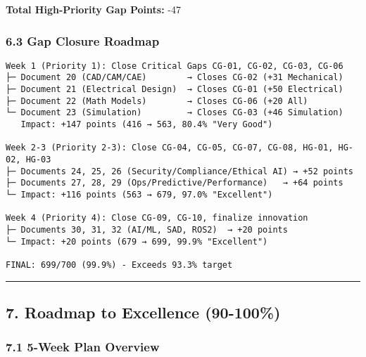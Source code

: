 \documentclass[
]{article}
\begin{document}
\textbf{Total High-Priority Gap Points:} -47

\hypertarget{gap-closure-roadmap}{%
\subsubsection{6.3 Gap Closure Roadmap}\label{gap-closure-roadmap}}

\begin{verbatim}
Week 1 (Priority 1): Close Critical Gaps CG-01, CG-02, CG-03, CG-06
├─ Document 20 (CAD/CAM/CAE)        → Closes CG-02 (+31 Mechanical)
├─ Document 21 (Electrical Design)  → Closes CG-01 (+50 Electrical)
├─ Document 22 (Math Models)        → Closes CG-06 (+20 All)
└─ Document 23 (Simulation)         → Closes CG-03 (+46 Simulation)
   Impact: +147 points (416 → 563, 80.4% "Very Good")

Week 2-3 (Priority 2-3): Close CG-04, CG-05, CG-07, CG-08, HG-01, HG-02, HG-03
├─ Documents 24, 25, 26 (Security/Compliance/Ethical AI) → +52 points
├─ Documents 27, 28, 29 (Ops/Predictive/Performance)   → +64 points
└─ Impact: +116 points (563 → 679, 97.0% "Excellent")

Week 4 (Priority 4): Close CG-09, CG-10, finalize innovation
├─ Documents 30, 31, 32 (AI/ML, SAD, ROS2)  → +20 points
└─ Impact: +20 points (679 → 699, 99.9% "Excellent")

FINAL: 699/700 (99.9%) - Exceeds 93.3% target
\end{verbatim}

\begin{center}\rule{0.5\linewidth}{0.5pt}\end{center}

\hypertarget{roadmap-to-excellence-90-100}{%
\subsection{7. Roadmap to Excellence
(90-100\%)}\label{roadmap-to-excellence-90-100}}

\hypertarget{week-plan-overview}{%
\subsubsection{7.1 5-Week Plan Overview}\label{week-plan-overview}}
\end{document}
